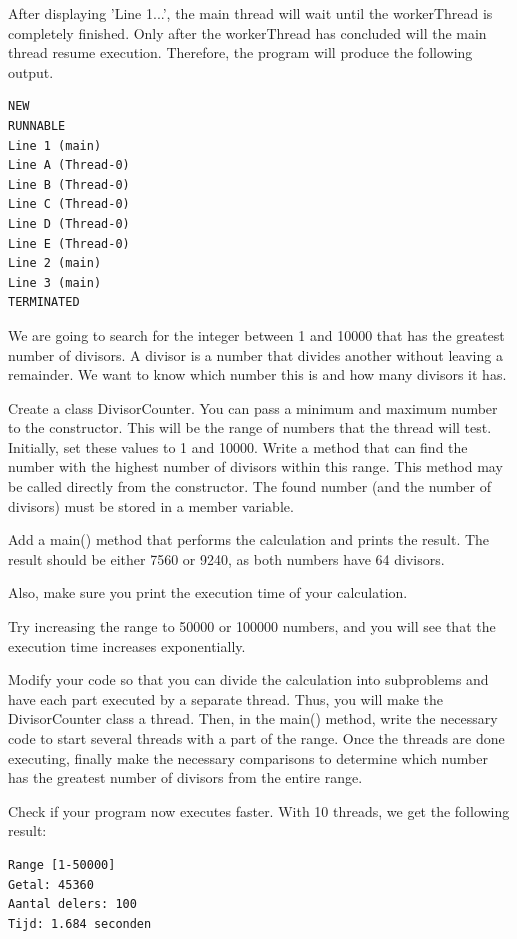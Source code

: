 After displaying 'Line 1...', the main thread will wait until the workerThread is completely finished. Only after the workerThread has concluded will the main thread resume execution. Therefore, the program will produce the following output.

\begin{verbatim}
NEW
RUNNABLE
Line 1 (main)
Line A (Thread-0)
Line B (Thread-0)
Line C (Thread-0)
Line D (Thread-0)
Line E (Thread-0)
Line 2 (main)
Line 3 (main)
TERMINATED
\end{verbatim}


\begin{oefening}
We are going to search for the integer between 1 and 10000 that has the greatest number of divisors. A divisor is a number that divides another without leaving a remainder. We want to know which number this is and how many divisors it has.

Create a class DivisorCounter. You can pass a minimum and maximum number to the constructor. This will be the range of numbers that the thread will test.
Initially, set these values to 1 and 10000. Write a method that can find the number with the highest number of divisors within this range. This method may be called directly from the constructor.
The found number (and the number of divisors) must be stored in a member variable.

Add a main() method that performs the calculation and prints the result.
The result should be either 7560 or 9240, as both numbers have 64 divisors.

Also, make sure you print the execution time of your calculation.

Try increasing the range to 50000 or 100000 numbers, and you will see that the execution time increases exponentially.

Modify your code so that you can divide the calculation into subproblems and have each part executed by a separate thread. Thus, you will make the DivisorCounter class a thread.
Then, in the main() method, write the necessary code to start several threads with a part of the range. Once the threads are done executing, finally make the necessary comparisons to determine which number has the greatest number of divisors from the entire range.

Check if your program now executes faster. With 10 threads, we get the following result:
\begin{verbatim}
Range [1-50000]
Getal: 45360
Aantal delers: 100
Tijd: 1.684 seconden
\end{verbatim}
\end{oefening}

